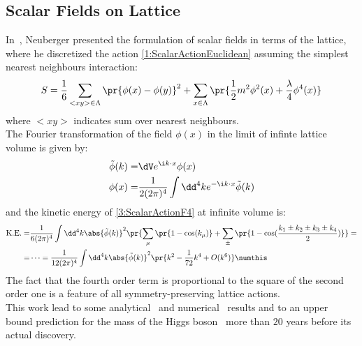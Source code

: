 \subsection{Scalar Fields on \spFtext Lattice}
In~\cite{Neuberger:1987kt}, Neuberger presented the formulation of scalar fields in terms of the \spFtext lattice, where he discretized the action \eqref{1:ScalarActionEuclidean} assuming the simplest nearest neighbours interaction:
\begin{equation}
    S = \frac16\sum_{<xy>\in\Lambda}\pr{\phi(x)-\phi(y)}^2 +\sum_{x\in\Lambda}\pr{\frac12m^2\phi^2(x)+\frac\lambda4\phi^4(x)} \label{3:ScalarActionF4}
\end{equation}
where $<xy>$ indicates sum over nearest neighbours.\\
The Fourier transformation of the field $\phi(x)$ in the limit of infinte lattice volume is given by:
\begin{align*}
    \tilde\phi(k) =& \dV e^{\i k \cdot x} \phi(x) \\
    \phi(x) =& \frac1{2(2\pi)^4} \int\dd^4k e^{-\i k \cdot x} \tilde\phi(k)
\end{align*}
and the kinetic energy of \eqref{3:ScalarActionF4} at infinite volume is:
\begin{align*}
    \text{K.E.} =& \frac1{6(2\pi)^4} \int\dd^4k \abs{\tilde\phi(k)}^2\pr{\sum_\mu\pr{1-\cos(k_\mu)} +\sum_\pm\pr{1-\cos(\frac{k_1\pm k_2\pm k_3\pm k_4}{2})}} =\\
    =& \dots = \frac{1}{12(2\pi)^4} \int\dd^4k \abs{\tilde\phi(k)}^2\pr{k^2-\frac{1}{72}k^4+O(k^6)} \numthis\label{3:ScalarKE}
\end{align*}
The fact that the fourth order term is proportional to the square of the second order one is a feature of all symmetry-preserving lattice actions.\\
This work lead to some analytical~\cite{Bhanot:1990zd} and numerical~\cite{Bhanot:1990ai} results and to an upper bound prediction for the mass of the Higgs boson~\cite{Heller:1990sg} more than $20$ years before its actual discovery.

